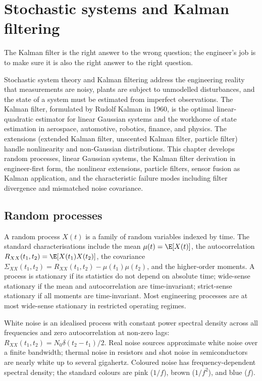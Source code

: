 \chapter{Stochastic systems and Kalman filtering}
\label{vol09:ch06}

\epigraph{The Kalman filter is the right answer to the wrong question; the engineer's job is to make sure it is also the right answer to the right question.}{}


\noindent
Stochastic system theory and Kalman filtering address the engineering reality that measurements are noisy, plants are subject to unmodelled disturbances, and the state of a system must be estimated from imperfect observations. The Kalman filter, formulated by Rudolf Kalman in 1960, is the optimal linear-quadratic estimator for linear Gaussian systems and the workhorse of state estimation in aerospace, automotive, robotics, finance, and physics. The extensions (extended Kalman filter, unscented Kalman filter, particle filter) handle nonlinearity and non-Gaussian distributions. This chapter develops random processes, linear Gaussian systems, the Kalman filter derivation in engineer-first form, the nonlinear extensions, particle filters, sensor fusion as Kalman application, and the characteristic failure modes including filter divergence and mismatched noise covariance.

\section{Random processes}

A random process $X(t)$ is a family of random variables indexed by time. The standard characterisations include the mean $\mu(t) = \E[X(t)]$, the autocorrelation $R_{XX}(t_1, t_2) = \E[X(t_1) X(t_2)]$, the covariance $\Sigma_{XX}(t_1, t_2) = R_{XX}(t_1, t_2) - \mu(t_1)\mu(t_2)$, and the higher-order moments. A process is stationary if its statistics do not depend on absolute time; wide-sense stationary if the mean and autocorrelation are time-invariant; strict-sense stationary if all moments are time-invariant. Most engineering processes are at most wide-sense stationary in restricted operating regimes.

White noise is an idealised process with constant power spectral density across all frequencies and zero autocorrelation at non-zero lags: $R_{XX}(t_1, t_2) = N_0 \delta(t_2 - t_1)/2$. Real noise sources approximate white noise over a finite bandwidth; thermal noise in resistors and shot noise in semiconductors are nearly white up to several gigahertz. Coloured noise has frequency-dependent spectral density; the standard colours are pink ($1/f$), brown ($1/f^2$), and blue ($f$).


